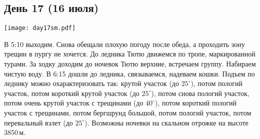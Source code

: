 \graphicspath{{Pictures/Chapter5/Day17}}

\subsection{День 17 (16 июля)}\label{subsec:Day17}

    \parbox[c]{\textwidth}{%
        \texttt{[image: day17sm.pdf]}\label{fig:Day17_map}%
    }
    \vspace{0.8cm}

    В 5:10 выходим. Снова обещали плохую погоду после обеда, а проходить зону трещин в пургу не хочется. До ледника
    Тютю движемся по тропе, маркированной турами. За ходку доходим до ночевок Тютю верхние, встречаем группу.
    Набираем чистую воду. В 6:15 дошли до ледника, связываемся, надеваем кошки. Подъем по леднику можно
    охарактеризовать так: крутой участок (до $25^\circ$), потом пологий участок, потом короткий крутой участок
    (до $25^\circ$), потом снова пологий участок, потом очень крутой участок с трещинами (до $40^\circ$), потом
    короткий пологий участок с трещинами, потом бергшрунд большой, потом пологий участок, потом перевальный взлет
    (до $25^\circ$). Возможны ночевки на скальном отрожке на высоте 3850\,м.

